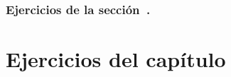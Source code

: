 \subsubsection*{Ejercicios de la sección~.}

\begin{enumerate}

\end{enumerate}




\section{Ejercicios del capítulo~}

\begin{enumerate}





\end{enumerate}



